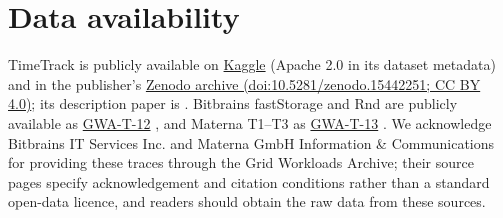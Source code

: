 \documentclass[5p,twocolumn]{elsarticle}
\begin{document}
\section*{Data availability}

TimeTrack is publicly available on
\href{https://www.kaggle.com/datasets/abdelghanimeliani/open-air-interface-cicd-timeseries-dataset}{Kaggle}
(Apache 2.0 in its dataset metadata) and in the publisher's
\href{https://doi.org/10.5281/zenodo.15442251}{Zenodo archive
(doi:10.5281/zenodo.15442251; CC BY 4.0)}; its description paper is
\citet{Meliani2025TimeTrack}. Bitbrains fastStorage and Rnd are publicly
available as \href{https://atlarge-research.com/gwa-t-12/}{GWA-T-12}
\citep{Shen2015Bitbrains}, and Materna T1--T3 as
\href{https://atlarge-research.com/gwa-t-13/}{GWA-T-13}
\citep{Kohne2014FederatedCloudSim,Kohne2016SLAScheduling}. We acknowledge
Bitbrains IT Services Inc. and Materna GmbH Information \& Communications for
providing these traces through the Grid Workloads Archive; their source pages
specify acknowledgement and citation conditions rather than a standard
open-data licence, and readers should obtain the raw data from these sources.
\end{document}
